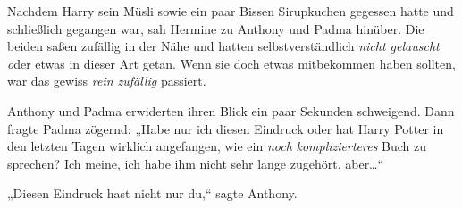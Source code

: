 Nachdem Harry sein Müsli sowie ein paar Bissen Sirupkuchen gegessen hatte und schließlich gegangen war, sah Hermine zu Anthony und Padma hinüber. Die beiden saßen zufällig in der Nähe und hatten selbstverständlich \emph{nicht gelauscht o}der etwas in dieser Art getan. Wenn sie doch etwas mitbekommen haben sollten, war das gewiss \emph{rein zufällig} passiert.

Anthony und Padma erwiderten ihren Blick ein paar Sekunden schweigend. Dann fragte Padma zögernd: „Habe nur ich diesen Eindruck oder hat Harry Potter in den letzten Tagen wirklich angefangen, wie ein \emph{noch} \emph{komplizierteres} Buch zu sprechen? Ich meine, ich habe ihm nicht sehr lange zugehört, aber…“

„Diesen Eindruck hast nicht nur du,“ sagte Anthony.

